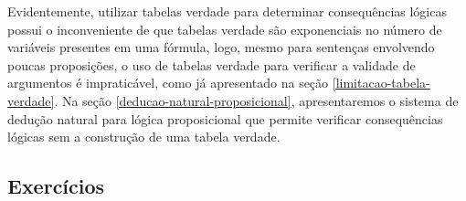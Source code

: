 Evidentemente, utilizar tabelas verdade para determinar
consequ\^encias l\'ogicas possui o inconveniente de que tabelas
verdade s\~ao exponenciais no n\'umero de vari\'aveis presentes em uma
f\'ormula, logo, mesmo para senten\c{c}as envolvendo poucas
proposi\c{c}\~oes, o uso de tabelas verdade para verificar a validade
de argumentos \'e impratic\'avel, como j\'a apresentado na se\c{c}\~ao
\ref{limitacao-tabela-verdade}. Na se\c{c}\~ao
\ref{deducao-natural-proposicional}, apresentaremos o sistema de
dedu\c{c}\~ao natural para l\'ogica proposicional que permite
verificar consequ\^encias l\'ogicas sem a constru\c{c}\~ao de uma
tabela verdade.

\subsection{Exerc\'icios}

